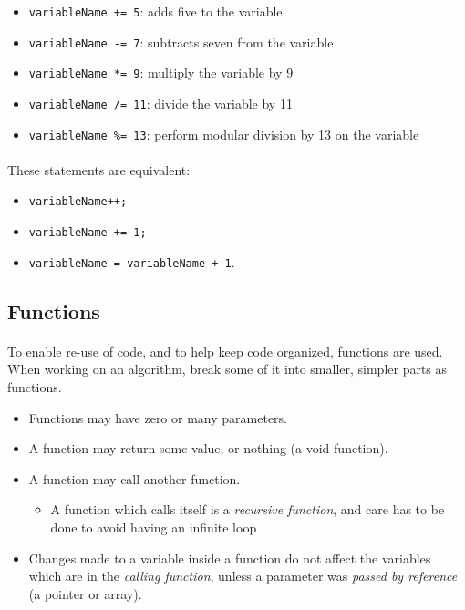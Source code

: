 \documentclass[letter,11pt]{article}
\begin{document}
\begin{itemize}
    \item \texttt{variableName += 5}: adds five to the variable
    \item \texttt{variableName -= 7}: subtracts seven from the variable
    \item \texttt{variableName *= 9}: multiply the variable by 9
    \item \texttt{variableName /= 11}: divide the variable by 11
    \item \texttt{variableName \%= 13}: perform modular division by 13 on the variable
\end{itemize}

\paragraph{}These statements are equivalent:
\begin{itemize}
    \item \texttt{variableName++;}
    \item \texttt{variableName += 1;}
    \item \texttt{variableName = variableName + 1}.
\end{itemize}

\FloatBarrier
\subsection{Functions}
\paragraph{}To enable re-use of code, and to help keep code organized, functions are used. When working on an algorithm, break some of it into smaller, simpler parts as functions.
\begin{itemize}
    \item Functions may have zero or many parameters.
    \item A function may return some value, or nothing (a void function).
    \item A function may call another function.
    \begin{itemize}
        \item A function which calls itself is a \textit{recursive function}, and care has to be done to avoid having an infinite loop
    \end{itemize}
    \item Changes made to a variable inside a function do not affect the variables which are in the \textit{calling function}, unless a parameter was \textit{passed by reference} (a pointer or array).
\end{itemize}
\end{document}
